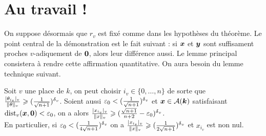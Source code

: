 \documentclass{mpg-preth}
\begin{document}
\section{Au travail !}

On suppose désormais que $r_v$ est fixé comme dans les hypothèses du théorème.
Le point central de la démonstration est le fait suivant : si ${\boldsymbol{x}}$ et
${\boldsymbol{y}}$ sont suffisament proches $v$-adiquement de ${\boldsymbol{0}}$, alors leur
différence aussi. Le lemme principal consistera à rendre cette affirmation
quantitative. On aura besoin du lemme technique suivant.

\begin{lem} \label{pv}
  Soit $v$ une place de $k$, on peut choisir $i_v \in \{ 0, \dots, n\}$ de
  sorte que $\frac{\lvert\theta_{i_v}\rvert_{v}}{\lVert\theta\rVert_{v}} \geqslant (\frac{1}{\sqrt{n+1}})^{\delta\smash{_v}}
  $.  Soient aussi $\varepsilon_0 < (\frac{1}{\sqrt{n+1}})^{\delta\smash{_v}}$ et ${\boldsymbol{x}} \in
  \mathcal{A}(\boldsymbol{k})$ satisfaisant $\mathrm{dist}_v({\boldsymbol{x}}, {\boldsymbol{0}}) < \varepsilon_0$, on a alors
  $\frac{\lvert x_{i_v}\rvert_{v}}{\lVert x\rVert_{v}} \geqslant (\frac{\sqrt{n+1}}{n+2}-\varepsilon_0)^{\delta\smash{_v}}$. \\ En
  particulier, si $\varepsilon_0 < (\frac{1}{4\sqrt{n+1}})^{\delta\smash{_v}}$ on a
  $\frac{\lvert x_{i_v}\rvert_{v}}{\lVert x\rVert_{v}} \geqslant (\frac{1}{2\sqrt{n+1}})^{\delta\smash{_v}}$ et $x_{i_v}$
  est non nul.
\end{lem}
\end{document}
